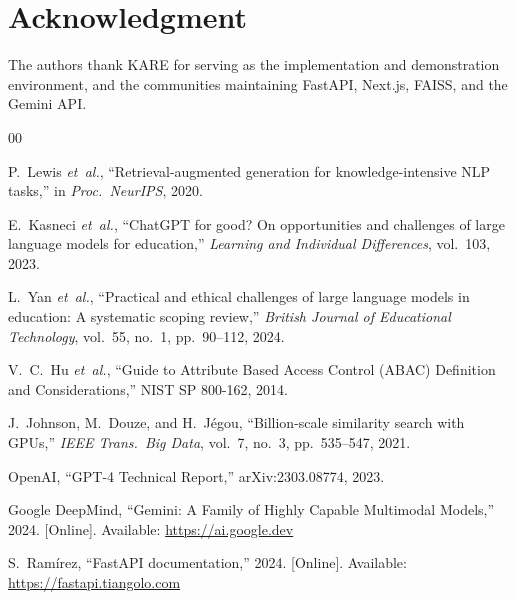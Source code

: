 \documentclass[conference]{IEEEtran}
\begin{document}
\section*{Acknowledgment}
The authors thank KARE for serving as the implementation and demonstration environment, and the communities maintaining FastAPI, Next.js, FAISS, and the Gemini API.

\begin{thebibliography}{00}

P.~Lewis \emph{et~al.}, ``Retrieval-augmented generation for knowledge-intensive NLP tasks,'' in \textit{Proc.\ NeurIPS}, 2020.

E.~Kasneci \emph{et~al.}, ``ChatGPT for good? On opportunities and challenges of large language models for education,'' \textit{Learning and Individual Differences}, vol.~103, 2023.

L.~Yan \emph{et~al.}, ``Practical and ethical challenges of large language models in education: A systematic scoping review,'' \textit{British Journal of Educational Technology}, vol.~55, no.~1, pp.~90--112, 2024.

V.~C.~Hu \emph{et~al.}, ``Guide to Attribute Based Access Control (ABAC) Definition and Considerations,'' NIST SP 800-162, 2014.

J.~Johnson, M.~Douze, and H.~J\'{e}gou, ``Billion-scale similarity search with GPUs,'' \textit{IEEE Trans.\ Big Data}, vol.~7, no.~3, pp.~535--547, 2021.

OpenAI, ``GPT-4 Technical Report,'' arXiv:2303.08774, 2023.

Google DeepMind, ``Gemini: A Family of Highly Capable Multimodal Models,'' 2024. [Online]. Available: \url{https://ai.google.dev}

S.~Ram\'{i}rez, ``FastAPI documentation,'' 2024. [Online]. Available: \url{https://fastapi.tiangolo.com}

\end{thebibliography}
\end{document}

